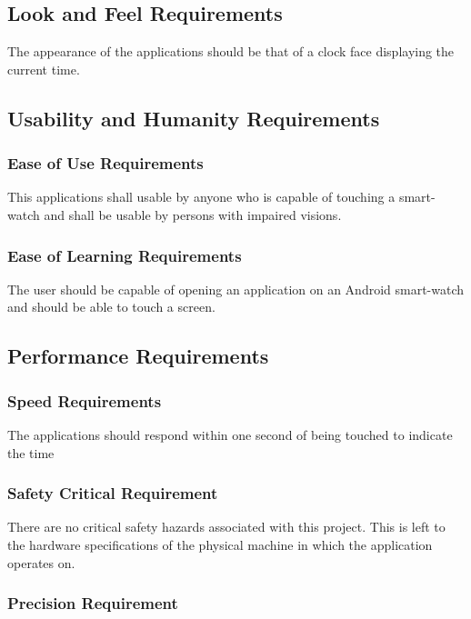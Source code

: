 \documentclass[12pt, titlepage]{article}
\begin{document}
\subsection{Look and Feel Requirements}

The appearance of the applications should be that of a clock face displaying the current time.

\subsection{Usability and Humanity Requirements}

\subsubsection{Ease of Use Requirements}

This applications shall usable by anyone who is capable of touching a smart-watch and shall be usable by persons with impaired visions. 


\subsubsection{Ease of Learning Requirements}

The user should be capable of opening an application on an Android smart-watch and should be able to touch a screen. %

\subsection{Performance Requirements}

\subsubsection{Speed Requirements}

The applications should respond within one second of being touched to indicate the time %

\subsubsection{Safety Critical Requirement}

There are no critical safety hazards associated with this project. This is left to the hardware specifications of the physical machine in which the application operates on. 

\subsubsection{Precision Requirement}
\end{document}
